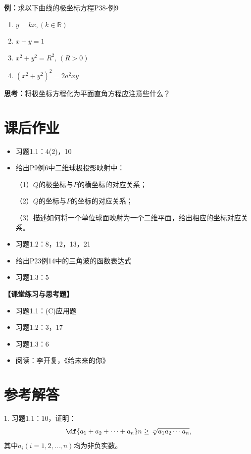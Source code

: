 {{\bf 例：}求以下曲线的极坐标方程\hfill P38-例9}
		
\begin{enumerate}[(1)]
  \setlength{\itemindent}{1cm}
  \item $y=kx,(k\in\mathbb{R})$
  \item $x+y=1$
  \item $x^2+y^2=R^2,\,(R>0)$
  \item $(x^2+y^2)^2=2a^2xy$
\end{enumerate}
	
{\bf 思考：}将极坐标方程化为平面直角方程应注意些什么？

\newpage

\section*{课后作业}
	
\begin{itemize}
  \item 习题1.1：4(2)，10
  \item 给出P9例6中二维球极投影映射中：
  
  （1）$Q$的极坐标与$P$的横坐标的对应关系；
  
  （2）$Q$的坐标与$P$的坐标的对应关系；
  
  （3）描述如何将一个单位球面映射为一个二维平面，给出相应的坐标对应关系。
  \item 习题1.2：8，12，13，21
  \item 给出P23例14中的三角波的函数表达式
  \item 习题1.3：5
\end{itemize}

{\bf 【课堂练习与思考题】}

\begin{itemize}
  \item 习题1.1：(C)应用题
  \item 习题1.2：3，17
  \item 习题1.3：6
  \item 阅读：李开复，《给未来的你》
\end{itemize}

\newpage

\section*{参考解答}

1. 习题1.1：10，证明：
$$\df{a_1+a_2+\cdots+a_n}n\geq\sqrt[n]{a_1a_2\cdots a_n},$$
其中$a_i(i=1,2,\ldots,n)$均为非负实数。

